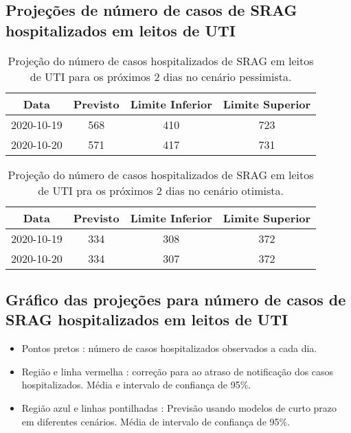 \documentclass[
]{article}
\providecommand{\tightlist}{%
  \setlength{\itemsep}{0pt}\setlength{\parskip}{0pt}}
\begin{document}
\hypertarget{projeuxe7uxf5es-de-nuxfamero-de-casos-de-srag-hospitalizados-em-leitos-de-uti}{%
\subsection{Projeções de número de casos de SRAG hospitalizados em
leitos de
UTI}\label{projeuxe7uxf5es-de-nuxfamero-de-casos-de-srag-hospitalizados-em-leitos-de-uti}}

\begin{table}

\caption{\label{tab:projecoes_UTIExp}Projeção do número de casos hospitalizados de SRAG em leitos de UTI para os próximos 2 dias no cenário pessimista.}
\centering
\begin{tabular}[t]{c|c|c|c}
\hline
Data & Previsto & Limite Inferior & Limite Superior\\
\hline
2020-10-19 & 568 & 410 & 723\\
\hline
2020-10-20 & 571 & 417 & 731\\
\hline
\end{tabular}
\end{table}
\begin{table}

\caption{\label{tab:projecoes_UTILogist}Projeção do número de casos hospitalizados de SRAG em leitos de UTI pra os próximos 2 dias no cenário otimista.}
\centering
\begin{tabular}[t]{c|c|c|c}
\hline
Data & Previsto & Limite Inferior & Limite Superior\\
\hline
2020-10-19 & 334 & 308 & 372\\
\hline
2020-10-20 & 334 & 307 & 372\\
\hline
\end{tabular}
\end{table}
\newpage

\hypertarget{gruxe1fico-das-projeuxe7uxf5es-para-nuxfamero-de-casos-de-srag-hospitalizados-em-leitos-de-uti}{%
\subsection{Gráfico das projeções para número de casos de SRAG
hospitalizados em leitos de
UTI}\label{gruxe1fico-das-projeuxe7uxf5es-para-nuxfamero-de-casos-de-srag-hospitalizados-em-leitos-de-uti}}

\begin{itemize}
\tightlist
\item
  Pontos pretos : número de casos hospitalizados observados a cada dia.
\item
  Região e linha vermelha : correção para ao atraso de notificação dos
  casos hospitalizados. Média e intervalo de confiança de 95\%.
\item
  Região azul e linhas pontilhadas : Previsão usando modelos de curto
  prazo em diferentes cenários. Média de intervalo de confiança de 95\%.
\end{itemize}
\end{document}
